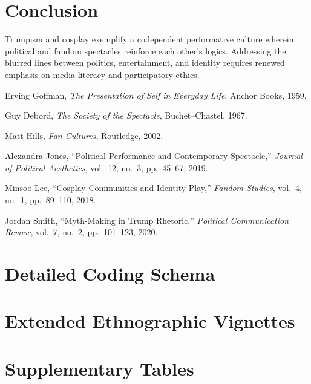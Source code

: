 \documentclass[11pt]{article}
\begin{document}
\section{Conclusion}
Trumpism and cosplay exemplify a codependent performative culture wherein political and fandom spectacles reinforce each other’s logics. Addressing the blurred lines between politics, entertainment, and identity requires renewed emphasis on media literacy and participatory ethics.

\clearpage
\begin{thebibliography}{99}
Erving Goffman, \emph{The Presentation of Self in Everyday Life}, Anchor Books, 1959.

Guy Debord, \emph{The Society of the Spectacle}, Buchet–Chastel, 1967.

Matt Hills, \emph{Fan Cultures}, Routledge, 2002.

Alexandra Jones, “Political Performance and Contemporary Spectacle,” \emph{Journal of Political Aesthetics}, vol.\ 12, no.\ 3, pp.\ 45–67, 2019.

Minsoo Lee, “Cosplay Communities and Identity Play,” \emph{Fandom Studies}, vol.\ 4, no.\ 1, pp.\ 89–110, 2018.

Jordan Smith, “Myth-Making in Trump Rhetoric,” \emph{Political Communication Review}, vol.\ 7, no.\ 2, pp.\ 101–123, 2020.
\end{thebibliography}

\appendix
\section{Detailed Coding Schema}
\section{Extended Ethnographic Vignettes}
\section{Supplementary Tables}
\end{document}
